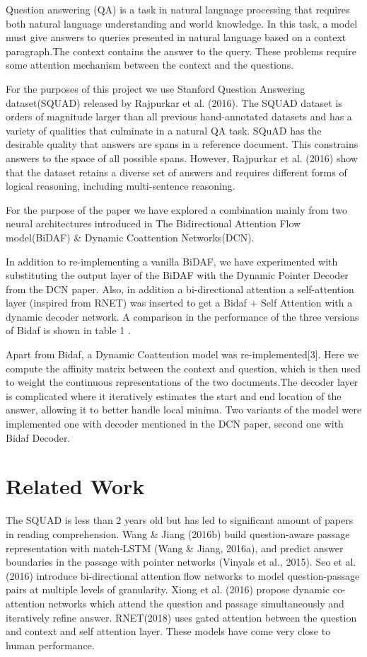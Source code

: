 \documentclass{article} %
\begin{document}
Question answering (QA) is a task in natural language processing that requires both natural language understanding and world knowledge. In this task, a model must give answers to queries presented in natural language based on a context paragraph.The context contains the answer to the query. These problems require some attention mechanism between the context and the questions.

For the purposes of this project we use Stanford Question Answering dataset(SQUAD) released by Rajpurkar et al. (2016). The SQUAD dataset is orders of magnitude larger than all previous hand-annotated datasets and has a variety of qualities that culminate in a natural QA task. SQuAD has the desirable quality that answers are spans in a reference document. This constrains answers to the space of all possible spans. However, Rajpurkar et al. (2016) show that the dataset retains a diverse set of answers and requires different forms of logical reasoning, including multi-sentence reasoning.

For the purpose of the paper we have explored a combination mainly from two neural architectures introduced in The Bidirectional Attention Flow model(BiDAF) \& Dynamic Coattention Networks(DCN).

In addition to re-implementing a vanilla BiDAF, we have experimented with substituting the output layer of the BiDAF with the Dynamic Pointer Decoder from the DCN paper. Also, in addition a bi-directional attention a self-attention layer (inspired from RNET) was inserted to get a Bidaf + Self Attention with a dynamic decoder network. A comparison in the performance of the three versions of Bidaf is shown in table 1 .

Apart from Bidaf, a Dynamic Coattention model  was re-implemented[3]. Here we compute the affinity matrix between the context and question, which is then used to weight the continuous representations of the two documents.The decoder layer is complicated where it iteratively  estimates the start and end location of the answer, allowing it to better handle local minima. Two variants of the model were implemented one with decoder mentioned in the DCN paper, second one with Bidaf Decoder.


\section{Related Work}
The SQUAD is less than 2 years old but has led to significant amount of papers in reading comprehension. Wang \& Jiang (2016b) build question-aware passage representation with match-LSTM (Wang \& Jiang, 2016a), and predict
answer boundaries in the passage with pointer networks (Vinyals et al., 2015).  Seo et al. (2016) introduce bi-directional attention flow networks to model question-passage pairs at multiple levels of granularity. Xiong et al. (2016) propose dynamic co-attention networks which attend the question and passage simultaneously and iteratively refine answer. RNET(2018) uses gated attention between the question and context and self attention layer. These models have come very close to human performance. 
\end{document}
